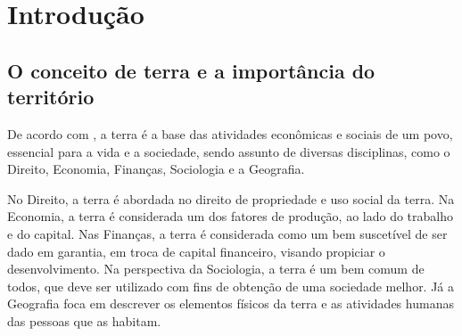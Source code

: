 \documentclass[
	12pt,				%
	oneside,			%
	a4paper,			%
	chapter=TITLE,		%
	section=TITLE,		%
	english,			%
	brazil				%
	]{abntex2}
\begin{document}
{%
	\hypersetup{hidelinks}
	\listoffigures*
	\cleardoublepage
	
	\listofquadros*
	\cleardoublepage
	
	\listoftables*
	\cleardoublepage
	
	\imprimirlistadesiglas
	
	\imprimirlistadesimbolos
	
	\tableofcontents*
	\cleardoublepage
	
}%


\textual

\hypertarget{intro}{\chapter{Introdução}\label{intro}}

\section{O conceito de terra e a importância do
território}\label{o-conceito-de-terra-e-a-importuxe2ncia-do-territuxf3rio}

De acordo com \textcite{realestate}, a terra é a base das atividades
econômicas e sociais de um povo, essencial para a vida e a sociedade,
sendo assunto de diversas disciplinas, como o Direito, Economia,
Finanças, Sociologia e a Geografia.

No Direito, a terra é abordada no direito de propriedade e uso social da
terra. Na Economia, a terra é considerada um dos fatores de produção, ao
lado do trabalho e do capital. Nas Finanças, a terra é considerada como
um bem suscetível de ser dado em garantia, em troca de capital
financeiro, visando propiciar o desenvolvimento. Na perspectiva da
Sociologia, a terra é um bem comum de todos, que deve ser utilizado com
fins de obtenção de uma sociedade melhor. Já a Geografia foca em
descrever os elementos físicos da terra e as atividades humanas das
pessoas que as habitam.
\end{document}
